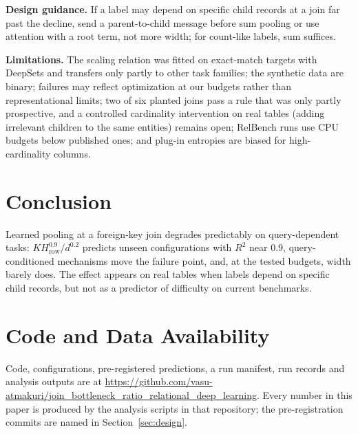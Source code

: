\documentclass[conference]{IEEEtran}
\begin{document}
\textbf{Design guidance.} If a label may depend on specific child records at a join far past the decline, send a parent-to-child message before sum pooling or use attention with a root term, not more width; for count-like labels, sum suffices.

\textbf{Limitations.} The scaling relation was fitted on exact-match targets with DeepSets and transfers only partly to other task families; the synthetic data are binary; failures may reflect optimization at our budgets rather than representational limits; two of six planted joins pass a rule that was only partly prospective, and a controlled cardinality intervention on real tables (adding irrelevant children to the same entities) remains open; RelBench runs use CPU budgets below published ones; and plug-in entropies are biased for high-cardinality columns.

\section{Conclusion}

Learned pooling at a foreign-key join degrades predictably on query-dependent tasks: $K H_{\mathrm{row}}^{0.9}/d^{0.2}$ predicts unseen configurations with $R^2$ near $0.9$, query-conditioned mechanisms move the failure point, and, at the tested budgets, width barely does. The effect appears on real tables when labels depend on specific child records, but not as a predictor of difficulty on current benchmarks.

\section*{Code and Data Availability}
Code, configurations, pre-registered predictions, a run manifest, run records and analysis outputs are at \url{https://github.com/vasu-atmakuri/join_bottleneck_ratio_relational_deep_learning}. Every number in this paper is produced by the analysis scripts in that repository; the pre-registration commits are named in Section~\ref{sec:design}.



\end{document}
